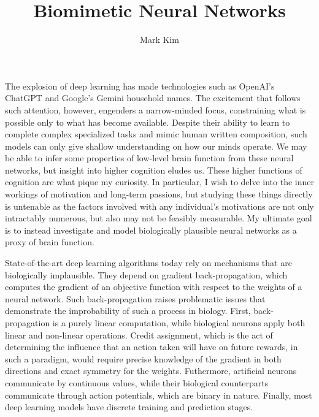 \documentclass[12pt]{article}
\title{Biomimetic Neural Networks}
\author{Mark Kim}
\begin{document}
\maketitle

The explosion of deep learning has made technologies such as OpenAI's ChatGPT
and Google's Gemini household names.  The excitement that follows such
attention, however, engenders a narrow-minded focus, constraining what is
possible only to what has become available.  Despite their ability
to learn to complete complex specialized tasks and mimic human written
composition, such models can only give shallow understanding on how our minds
operate. We may be able to infer some properties of low-level brain function
from these neural networks, but insight into higher cognition eludes us.  These higher
functions of cognition are what pique my curiosity.  In particular, I wish to
delve into the inner workings of motivation and long-term passions, but studying
these things directly is untenable as the factors involved with any individual's
motivations are not only intractably numerous, but also may not be feasibly
measurable.  My ultimate goal is to instead investigate and model biologically
plausible neural networks as a proxy of brain function.

State-of-the-art deep learning algorithms today rely on mechanisms that are
biologically implausible.  They depend on gradient back-propagation, which
computes the gradient of an objective function with respect to the weights of a
neural network.  Such back-propagation raises problematic issues that
demonstrate the improbability of such a process in biology.  First,
back-propagation is a purely linear computation, while biological neurons apply
both linear and non-linear operations. Credit assignment, which is the act of
determining the influence that an action taken will have on future rewards, in
such a paradigm, would require precise knowledge of the gradient in both
directions and exact symmetry for the weights.  Futhermore, artificial neurons
communicate by continuous values, while their biological counterparts
communicate through action potentials, which are binary in nature.  Finally,
most deep learning models have discrete training and prediction stages.
\end{document}
